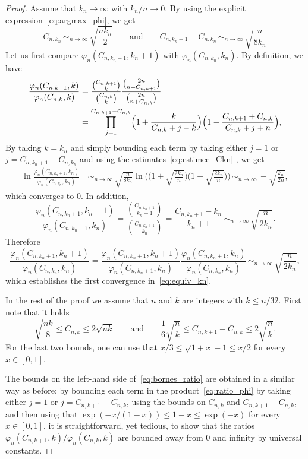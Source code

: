 \documentclass[JEP,XML,SOM,Unicode,NoFloatCountersInSection,NoEqCountersInSection]{cedram}
\theoremstyle{plain}
\theoremstyle{definition}
\theoremstyle{remark}
\newcommand{\equi}[1][n]{\,\mathop{\sim}^{}_{#1 \to \infty}\,}
\begin{document}
\begin{proof}
Assume that $k_n\to\infty$ with $k_n/n\to0$. By using the explicit expression~\eqref{eq:argmax_phi}, we get
\begin{equation}\label{eq:estimee_Ckn}
C_{n,k_n} \equi \sqrt{\frac{n k_n}{2}}
\qquad\text{and}\qquad
C_{n,k_n+1} - C_{n,k_n} \equi \sqrt{\frac{n}{8 k_n }}
\end{equation}
Let us first compare $\varphi_{n}(C_{n,k_{n}+1},k_{n}+1)$ with $\varphi_{n}(C_{n,k_{n}},k_{n})$. By definition, we have
\begin{equation}\label{eq:ratio_phi}
\begin{split}
\frac{\varphi_{n}(C_{n,k+1},k)}{\varphi_{n}(C_{n,k},k)}
&= \frac{\binom{C_{n,k+1}}{k}}{\binom{C_{n,k}}{k}} \frac{\binom{2n}{n+C_{n,k+1}}}{\binom{2n}{n+C_{n,k}}}\\
&= \prod_{j=1}^{C_{n,k+1}-C_{n,k}} \Bigl(1+\frac{k}{C_{n,k}+j-k} \Bigr) \Bigl(1- \frac{C_{n,k+1}+C_{n,k}}{C_{n,k}+j+n}\Bigr),
\end{split}
\end{equation}
By taking $k=k_{n}$ and simply bounding each term by taking either $j=1$ or $j=C_{n,k_{n}+1}-C_{n,k_{n}}$ and using the estimates~\eqref{eq:estimee_Ckn} , we get
\begin{align*}
\ln \frac{\varphi_{n}(C_{n,k_n+1},k_n)}{\varphi_{n}(C_{n,k_n},k_n)}
&\equi \sqrt{\frac{n}{8k_n}} \ln\biggl(\biggl(1+\sqrt{\frac{2k_n}{n}}\biggr) \biggl(1-\sqrt{\frac{2k_n}{n}}\biggr)\biggr)
\equi - \sqrt{\frac{k_n}{2n}},
\end{align*}
which converges to $0$. In addition,
\[
\frac{\varphi_{n}(C_{n,k_n+1},k_n+1)}{\varphi_{n}(C_{n,k_n+1},k_n)}
= \frac{\binom{C_{n,k_n+1}}{k_n+1}}{\binom{C_{n,k_n+1}}{k_n}}
= \frac{C_{n,k_n+1} - k_n}{k_n+1}
\equi \sqrt{\frac{n}{2k_n}}.
\]
Therefore
\[
\frac{\varphi_{n}(C_{n,k_n+1},k_n+1)}{\varphi_{n}(C_{n,k_n},k_n)}
= \frac{\varphi_{n}(C_{n,k_n+1},k_n+1)}{\varphi_{n}(C_{n,k_n+1},k_n)} \frac{\varphi_{n}(C_{n,k_n+1},k_n)}{\varphi_{n}(C_{n,k_n},k_n)}
\equi \sqrt{\frac{n}{2k_n}},
\]
which establishes the first convergence in~\eqref{eq:equiv_kn}.

In the rest of the proof we assume that $n$ and $k$ are integers with $k \le n/32$. First note that it holds
\[
\sqrt{\frac{n k}{8}}
\le C_{n,k}
\le 2 \sqrt{n k}
\qquad\text{and}\qquad
\frac{1}{6} \sqrt{\frac{n}{k}} \le C_{n,k+1} - C_{n,k} \le 2 \sqrt{\frac{n}{k}}.
\]
For the last two bounds, one can use that $x/3 \le \sqrt{1+x} - 1 \le x/2$ for every $x \in[0,1]$.

The bounds on the left-hand side of~\eqref{eq:bornes_ratio} are obtained in a similar way as before: by bounding each term in the product~\eqref{eq:ratio_phi} by taking either $j=1$ or $j=C_{n,k+1}-C_{n,k}$, using the bounds on $C_{n,k}$ and $C_{n,k+1}-C_{n,k}$, and then using that $\exp(-x/(1-x)) \le 1-x \le \exp(-x)$ for every $x \in [0,1]$, it is straightforward, yet tedious, to show that the ratios
$\varphi_{n}(C_{n,k+1},k)/\varphi_{n}(C_{n,k},k)$
are bounded away from $0$ and infinity by universal constants.


\end{proof}
\end{document}
